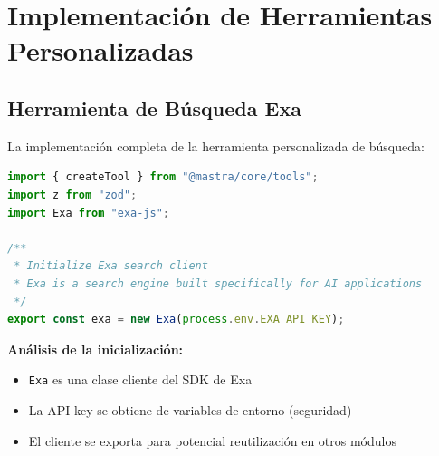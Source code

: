 \documentclass[12pt,a4paper]{article}
\begin{document}
\newpage

\section{Implementación de Herramientas Personalizadas}

\subsection{Herramienta de Búsqueda Exa}

La implementación completa de la herramienta personalizada de búsqueda:

\begin{lstlisting}[language=JavaScript, caption=src/mastra/tools/exaSearchTool.ts - Parte 1: Inicialización]
import { createTool } from "@mastra/core/tools";
import z from "zod";
import Exa from "exa-js";

/**
 * Initialize Exa search client
 * Exa is a search engine built specifically for AI applications
 */
export const exa = new Exa(process.env.EXA_API_KEY);
\end{lstlisting}

\textbf{Análisis de la inicialización:}
\begin{itemize}
    \item \texttt{Exa} es una clase cliente del SDK de Exa
    \item La API key se obtiene de variables de entorno (seguridad)
    \item El cliente se exporta para potencial reutilización en otros módulos
\end{itemize}
\end{document}

